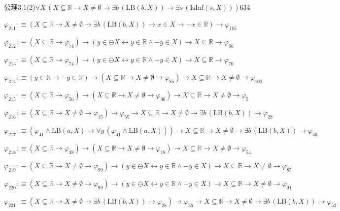 \begin{fullproof}{公理3.1(2)}{$\forall X\,(X \subseteq \mathbb{R} \to X \neq \emptyset \to \exists b\,(\mathrm{LB}(b,X)) \to \exists s\,(\mathrm{IsInf}(s,X)))$}{634}
\begin{abbrevlist}
\item $\varphi_{211} :\equiv (X \subseteq \mathbb{R} \to X \neq \emptyset \to \exists b\,(\mathrm{LB}(b,X)) \to x \in X \to -x \in \mathbb{R}) \to \varphi_{185}$
\item $\varphi_{212} :\equiv (X \subseteq \mathbb{R} \to \varphi_{74}) \to (y \in \ominus X \leftrightarrow y \in \mathbb{R} \land -y \in X) \to X \subseteq \mathbb{R} \to \varphi_{66}$
\item $\varphi_{213} :\equiv (X \subseteq \mathbb{R} \to \varphi_{74}) \to (y \in \ominus X \leftrightarrow y \in \mathbb{R} \land -y \in X) \to X \subseteq \mathbb{R} \to \varphi_{70}$
\item $\varphi_{214} :\equiv (y \in \mathbb{R} \to -y \in \mathbb{R}) \to (X \subseteq \mathbb{R} \to X \neq \emptyset \to \varphi_{85}) \to X \subseteq \mathbb{R} \to X \neq \emptyset \to \varphi_{100}$
\item $\varphi_{215} :\equiv (X \subseteq \mathbb{R} \to \varphi_{56}) \to (X \subseteq \mathbb{R} \to X \neq \emptyset \to \varphi_{30}) \to X \subseteq \mathbb{R} \to X \neq \emptyset \to \varphi_{5}$
\item $\varphi_{216} :\equiv (X \subseteq \mathbb{R} \to X \neq \emptyset \to \varphi_{15}) \to \varphi_{55} \to X \subseteq \mathbb{R} \to X \neq \emptyset \to \exists b\,(\mathrm{LB}(b,X)) \to \varphi_{28}$
\item $\varphi_{217} :\equiv (\varphi_{41} \land \mathrm{LB}(a,X) \to \forall y\,(\varphi_{41} \land \mathrm{LB}(a,X))) \to X \subseteq \mathbb{R} \to X \neq \emptyset \to \exists b\,(\mathrm{LB}(b,X)) \to \varphi_{46}$
\item $\varphi_{218} :\equiv (X \subseteq \mathbb{R} \to \varphi_{38}) \to (X \subseteq \mathbb{R} \to X \neq \emptyset \to \varphi_{18}) \to X \subseteq \mathbb{R} \to X \neq \emptyset \to \varphi_{54}$
\item $\varphi_{219} :\equiv (X \subseteq \mathbb{R} \to X \neq \emptyset \to \varphi_{99}) \to (y \in \ominus X \leftrightarrow y \in \mathbb{R} \land -y \in X) \to X \subseteq \mathbb{R} \to X \neq \emptyset \to \varphi_{85}$
\item $\varphi_{220} :\equiv (X \subseteq \mathbb{R} \to X \neq \emptyset \to \varphi_{99}) \to (y \in \ominus X \leftrightarrow y \in \mathbb{R} \land -y \in X) \to X \subseteq \mathbb{R} \to X \neq \emptyset \to \varphi_{91}$
\item $\varphi_{221} :\equiv (X \subseteq \mathbb{R} \to X \neq \emptyset \to \exists b\,(\mathrm{LB}(b,X)) \to \varphi_{28}) \to \varphi_{36} \to X \subseteq \mathbb{R} \to X \neq \emptyset \to \exists b\,(\mathrm{LB}(b,X)) \to \varphi_{52}$

\end{abbrevlist}
\end{fullproof}
